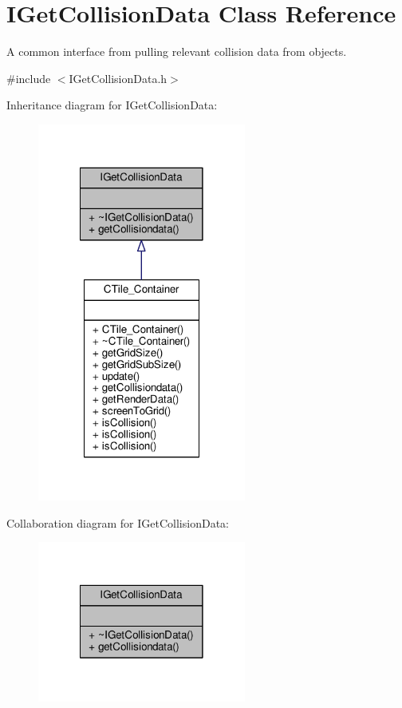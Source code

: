\hypertarget{classIGetCollisionData}{\section{I\-Get\-Collision\-Data Class Reference}
\label{classIGetCollisionData}
}


A common interface from pulling relevant collision data from objects.  




{\ttfamily \#include $<$I\-Get\-Collision\-Data.\-h$>$}



Inheritance diagram for I\-Get\-Collision\-Data\-:\nopagebreak
\begin{figure}[H]
\begin{center}
\leavevmode
\includegraphics[width=194pt]{classIGetCollisionData__inherit__graph}
\end{center}
\end{figure}


Collaboration diagram for I\-Get\-Collision\-Data\-:\nopagebreak
\begin{figure}[H]
\begin{center}
\leavevmode
\includegraphics[width=194pt]{classIGetCollisionData__coll__graph}
\end{center}
\end{figure}
